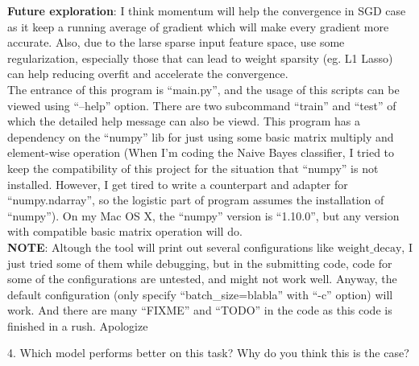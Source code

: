 \documentclass{article}
\theoremstyle{definition}
\theoremstyle{definition}
\theoremstyle{remark}
\begin{document}
\begin{addmargin}[3em]{2em}
  \textbf{Future exploration}: I think momentum will help the convergence in SGD case as it keep a running average of gradient which will make every gradient more accurate. Also, due to the larse sparse input feature space, use some regularization, especially those that can lead to weight sparsity (eg. L1 Lasso) can help reducing overfit and accelerate the convergence.\\

  The entrance of this program is ``main.py'', and the usage of this scripts can be viewed using ``--help'' option. There are two subcommand ``train'' and ``test'' of which the detailed help message can also be viewd. This program has a dependency on the ``numpy'' lib for just using some basic matrix multiply and element-wise operation (When I'm coding the Naive Bayes classifier, I tried to keep the compatibility of this project for the situation that ``numpy'' is not installed. However, I get tired to write a counterpart and adapter for ``numpy.ndarray'', so the logistic part of program assumes the installation of ``numpy''). On my Mac OS X, the ``numpy'' version is ``1.10.0'', but any version with compatible basic matrix operation will do.\\

  \textbf{NOTE}: Altough the tool will print out several configurations like $\mbox{weight\_decay}$, I just tried some of them while debugging, but in the submitting code, code for some of the configurations are untested, and might not work well. Anyway, the default configuration (only specify ``batch\_size=blabla'' with ``-c'' option) will work. And there are many ``FIXME'' and ``TODO'' in the code as this code is finished in a rush. Apologize \\


\end{addmargin}

4. Which model performs better on this task? Why do you think this is the case?
\end{document}
